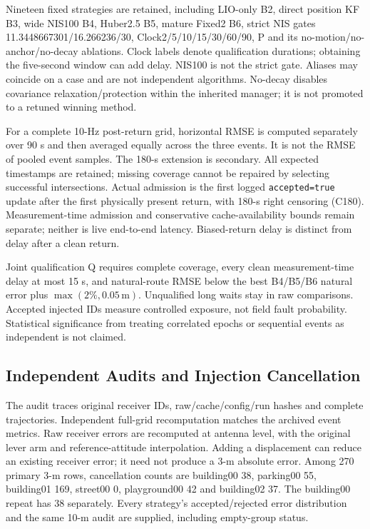\documentclass[conference]{IEEEtran}
\begin{document}
Nineteen fixed strategies are retained, including LIO-only B2, direct position KF B3, wide NIS100 B4, Huber2.5 B5, mature Fixed2 B6, strict NIS gates 11.3448667301/16.266236/30, Clock2/5/10/15/30/60/90, P and its no-motion/no-anchor/no-decay ablations. Clock labels denote qualification durations; obtaining the five-second window can add delay. NIS100 is not the strict gate. Aliases may coincide on a case and are not independent algorithms. No-decay disables covariance relaxation/protection within the inherited manager; it is not promoted to a retuned winning method.

For a complete 10-Hz post-return grid, horizontal RMSE is computed separately over 90 s and then averaged equally across the three events. It is not the RMSE of pooled event samples. The 180-s extension is secondary. All expected timestamps are retained; missing coverage cannot be repaired by selecting successful intersections. Actual admission is the first logged \texttt{accepted=true} update after the first physically present return, with 180-s right censoring (C180). Measurement-time admission and conservative cache-availability bounds remain separate; neither is live end-to-end latency. Biased-return delay is distinct from delay after a clean return.

Joint qualification Q requires complete coverage, every clean measurement-time delay at most 15 s, and natural-route RMSE below the best B4/B5/B6 natural error plus $\max(2\%,0.05\,\mathrm{m})$. Unqualified long waits stay in raw comparisons. Accepted injected IDs measure controlled exposure, not field fault probability. Statistical significance from treating correlated epochs or sequential events as independent is not claimed.

\subsection{Independent Audits and Injection Cancellation}
The audit traces original receiver IDs, raw/cache/config/run hashes and complete trajectories. Independent full-grid recomputation matches the archived event metrics. Raw receiver errors are recomputed at antenna level, with the original lever arm and reference-attitude interpolation. Adding a displacement can reduce an existing receiver error; it need not produce a 3-m absolute error. Among 270 primary 3-m rows, cancellation counts are building00 38, parking00 55, building01 169, street00 0, playground00 42 and building02 37. The building00 repeat has 38 separately. Every strategy's accepted/rejected error distribution and the same 10-m audit are supplied, including empty-group status.
\end{document}
